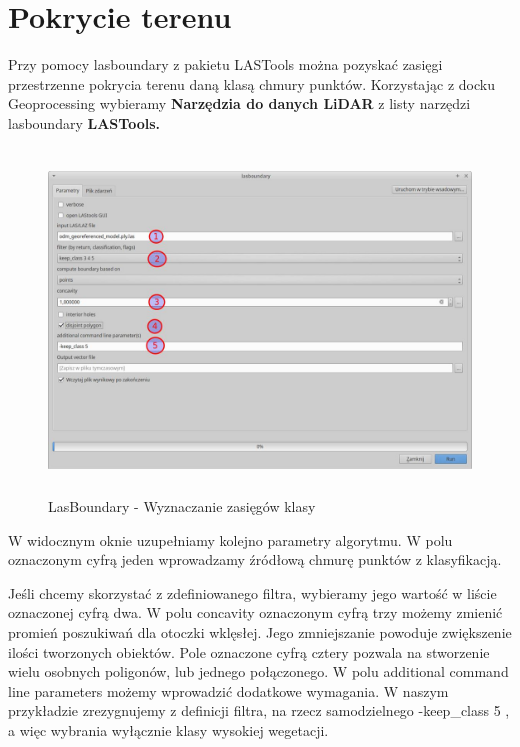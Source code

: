 \documentclass[12pt,a4paper]{book}
\begin{document}
\section{Pokrycie terenu}
Przy pomocy  lasboundary  z pakietu LASTools można pozyskać zasięgi przestrzenne pokrycia terenu daną klasą chmury punktów. Korzystając z docku Geoprocessing wybieramy \textbf{Narzędzia do danych LiDAR }z listy narzędzi lasboundary \textbf{LASTools.}



\begin{center}
\begin{figure}
\includegraphics[width=13cm,height=9.126cm]{005-lasboundary.jpg}
\caption{LasBoundary - Wyznaczanie zasięgów klasy}
\end{figure}
\end{center}
W widocznym oknie uzupełniamy kolejno parametry algorytmu. W polu oznaczonym cyfrą jeden wprowadzamy źródłową chmurę punktów z klasyfikacją.

Jeśli chcemy skorzystać z zdefiniowanego filtra, wybieramy jego wartość w liście oznaczonej cyfrą dwa. W polu  concavity  oznaczonym cyfrą trzy możemy zmienić promień poszukiwań dla otoczki wklęsłej. Jego zmniejszanie powoduje zwiększenie ilości tworzonych obiektów. Pole oznaczone cyfrą cztery pozwala na stworzenie wielu osobnych poligonów, lub jednego połączonego. W polu  additional command line parameters  możemy wprowadzić dodatkowe wymagania. W naszym przykładzie zrezygnujemy z definicji filtra, na rzecz samodzielnego  -keep\_class 5 , a więc wybrania wyłącznie klasy wysokiej wegetacji.
\end{document}
